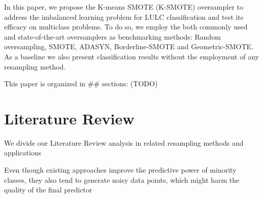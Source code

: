 \documentclass[parskip=full]{scrartcl}
\begin{document}
In this paper, we propose the K-means SMOTE (K-SMOTE) oversampler to address
the imbalanced learning problem for LULC classification and test its efficacy
on multiclass problems. To do so, we employ the both commonly used and
state-of-the-art oversamplers as benchmarking methods: Random oversampling,
SMOTE, ADASYN, Borderline-SMOTE and Geometric-SMOTE. As a baseline we also
present classification results without the employment of any resampling method.


This paper is organized in \#\# sections: (TODO)

\section{Literature Review}

We divide our Literature Review analysis in related resampling methods and
applications

Even though existing approaches improve the predictive power of minority
classes, they also tend to generate noisy data points, which might harm the
quality of the final predictor



\end{document}
